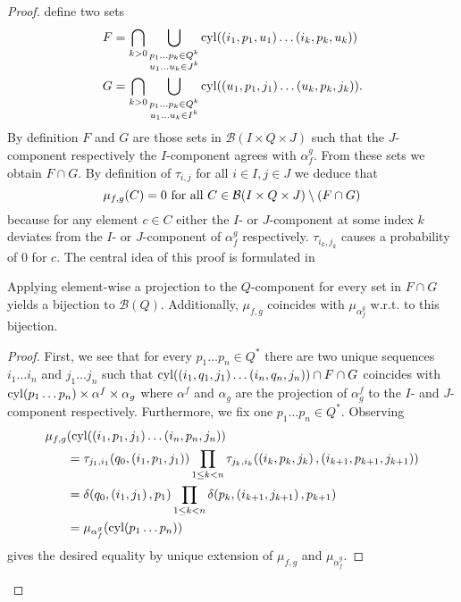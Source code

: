 \begin{proof}
  define two sets
  \begin{align*}
    F &= \bigcap_{k>0}\bigcup_{
      \substack{
        p_{1}\dots p_{k}\in Q^{k}\\
        u_{1}\dots u_{k}\in J^{k}
      }
    }\operatorname{cyl}(\left(i_{1}, p_{1}, u_{1}\right)\dots\left(i_{k}, p_{k}, u_{k}\right))\\
    G &= \bigcap_{k>0}\bigcup_{
      \substack{
        p_{1}\dots p_{k}\in Q^{k}\\
        u_{1}\dots u_{k}\in I^{k}
      }
    }\operatorname{cyl}(\left(u_{1}, p_{1}, j_{1}\right)\dots\left(u_{k}, p_{k}, j_{k}\right)).
  \end{align*}
  By definition $F$ and $G$ are those sets in $\mathcal{B}(I\times Q\times J)$ 
  such that the $J$-component respectively the $I$-component agrees with 
  $\alpha_{f}^{g}$. From these sets we obtain $F\cap G$.
  By definition of $\tau_{i, j}$ for all $i\in I, j\in J$ we deduce that 
  \begin{equation*}
    \mu_{f,g}(C) = 0\text{ for all }
    C\in \mathcal{B}(I\times Q\times J)\setminus\left(F\cap G\right)
  \end{equation*}
  because for any element $c\in C$ either the $I$- or $J$-component at some 
  index $k$ deviates from the $I$- or $J$-component of $\alpha_{f}^{g}$ 
  respectively. $\tau_{i_{k}, j_{k}}$ causes a probability of $0$ for $c$.
  The central idea of this proof is formulated in
  \begin{lemma}
    Applying element-wise a projection to the $Q$-component for every set in 
    $F\cap G$ yields a bijection to $\mathcal{B}(Q)$. Additionally, $\mu_{f,g}$ 
    coincides with $\mu_{\alpha_{f}^{g}}$ w.r.t. to this bijection.
    \label{lem:fginpba}
  \end{lemma}
  \begin{proof}
    First, we see that for every $p_{1}\dots p_{n}\in Q^{*}$ there are two 
    unique sequences $i_{1}\dots i_{n}$ and $j_{1}\dots j_{n}$ such that
    $\operatorname{cyl}(\left(i_{1}, q_{1}, j_{1}\right)\dots\left(i_{n}, q_{n}, j_{n}\right))\cap 
    F\cap G$ coincides with 
    $\operatorname{cyl}(p_{1}\dots p_{n})\times \alpha^{f}\times\alpha_{g}$ where 
    $\alpha^{f}$ and $\alpha_{g}$ are the projection of $\alpha^{f}_{g}$ to the
    $I$- and $J$-component respectively. Furthermore, we fix one 
    $p_{1}\dots p_{n}\in Q^{*}$. Observing
    \begin{align*}
      \mu_{f, g}&(
        \operatorname{cyl}(\left(i_{1}, p_{1}, j_{1}\right)\dots\left(i_{n}, p_{n}, j_{n}\right))\\
      &= \tau_{j_{1}, i_{1}}(q_{0}, \left(i_{1}, p_{1}, j_{1}\right))
        \prod\limits_{1\leq k < n}\tau_{j_{k}, i_{k}}(\left(i_{k}, p_{k}, 
          j_{k}\right),\left(i_{k+1}, p_{k+1}, j_{k+1}\right))\\
      &= \delta(q_{0}, \left(i_{1}, j_{1}\right), p_{1})
        \prod\limits_{1\leq k < n}\delta(p_{k}, \left(i_{k+1}, j_{k+1}\right), 
          p_{k+1})\\
      &= \mu_{\alpha_{f}^{g}}(\operatorname{cyl}(p_{1}\dots p_{n}))
    \end{align*}
    gives the desired equality by unique extension of $\mu_{f, g}$ and 
    $\mu_{\alpha_{f}^{g}}$.
  \end{proof}


\end{proof}
